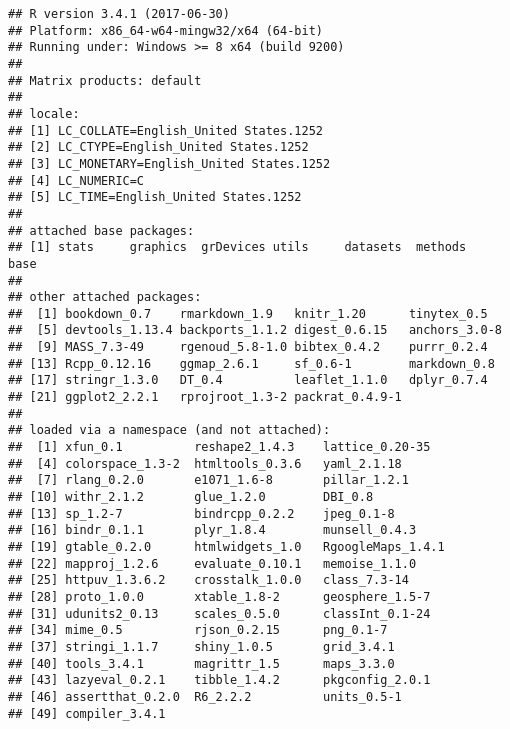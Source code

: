 \documentclass[]{article}
\begin{document}
\begin{verbatim}
## R version 3.4.1 (2017-06-30)
## Platform: x86_64-w64-mingw32/x64 (64-bit)
## Running under: Windows >= 8 x64 (build 9200)
## 
## Matrix products: default
## 
## locale:
## [1] LC_COLLATE=English_United States.1252 
## [2] LC_CTYPE=English_United States.1252   
## [3] LC_MONETARY=English_United States.1252
## [4] LC_NUMERIC=C                          
## [5] LC_TIME=English_United States.1252    
## 
## attached base packages:
## [1] stats     graphics  grDevices utils     datasets  methods   base     
## 
## other attached packages:
##  [1] bookdown_0.7    rmarkdown_1.9   knitr_1.20      tinytex_0.5    
##  [5] devtools_1.13.4 backports_1.1.2 digest_0.6.15   anchors_3.0-8  
##  [9] MASS_7.3-49     rgenoud_5.8-1.0 bibtex_0.4.2    purrr_0.2.4    
## [13] Rcpp_0.12.16    ggmap_2.6.1     sf_0.6-1        markdown_0.8   
## [17] stringr_1.3.0   DT_0.4          leaflet_1.1.0   dplyr_0.7.4    
## [21] ggplot2_2.2.1   rprojroot_1.3-2 packrat_0.4.9-1
## 
## loaded via a namespace (and not attached):
##  [1] xfun_0.1          reshape2_1.4.3    lattice_0.20-35  
##  [4] colorspace_1.3-2  htmltools_0.3.6   yaml_2.1.18      
##  [7] rlang_0.2.0       e1071_1.6-8       pillar_1.2.1     
## [10] withr_2.1.2       glue_1.2.0        DBI_0.8          
## [13] sp_1.2-7          bindrcpp_0.2.2    jpeg_0.1-8       
## [16] bindr_0.1.1       plyr_1.8.4        munsell_0.4.3    
## [19] gtable_0.2.0      htmlwidgets_1.0   RgoogleMaps_1.4.1
## [22] mapproj_1.2.6     evaluate_0.10.1   memoise_1.1.0    
## [25] httpuv_1.3.6.2    crosstalk_1.0.0   class_7.3-14     
## [28] proto_1.0.0       xtable_1.8-2      geosphere_1.5-7  
## [31] udunits2_0.13     scales_0.5.0      classInt_0.1-24  
## [34] mime_0.5          rjson_0.2.15      png_0.1-7        
## [37] stringi_1.1.7     shiny_1.0.5       grid_3.4.1       
## [40] tools_3.4.1       magrittr_1.5      maps_3.3.0       
## [43] lazyeval_0.2.1    tibble_1.4.2      pkgconfig_2.0.1  
## [46] assertthat_0.2.0  R6_2.2.2          units_0.5-1      
## [49] compiler_3.4.1
\end{verbatim}
\end{document}
